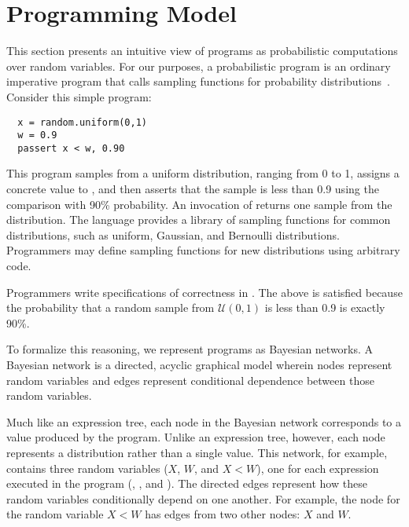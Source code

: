 \section{Programming Model}
\label{sec:model}
 
This section presents an intuitive view of programs as probabilistic
computations over random variables.
For our purposes, a probabilistic program is an ordinary imperative program
that calls sampling functions for probability distributions~\cite{kozen}.
Consider this simple program:
%
\begin{lstlisting}
  x = random.uniform(0,1)
  w = 0.9
  passert x < w, 0.90
\end{lstlisting}
%
This program samples from a uniform distribution, ranging from 0 to 1,
assigns a concrete value to , and then asserts that the sample is
less than 0.9 using the comparison  with 90\% probability.
An invocation
of  returns one sample from the distribution.
The language provides a library of sampling functions for common distributions, such as uniform, Gaussian,
and Bernoulli distributions. Programmers may define sampling functions for new distributions using
arbitrary code.

Programmers write specifications of correctness in \passerts. The above \passert is
satisfied because the probability that a random sample from 
$\mathcal{U}(0,1)$ is less than 0.9 is exactly 90\%.

To formalize this reasoning, we represent programs as Bayesian networks.
A Bayesian network is
a directed, acyclic graphical model wherein nodes represent random variables and
edges represent conditional dependence between those
random variables.
%
\begin{center}
{\scriptsize
{}
}
\end{center}
%
Much like an expression tree, each node in the Bayesian network corresponds to a value produced by the program.  Unlike an expression tree, however, each node represents a distribution rather than a single value.
This network, for example,
contains three random variables ($X$, $W$, and $X<W$), one for each
expression executed in the program (, ,
and ). The directed edges represent how these
random variables conditionally depend on one another. For example,
the node for the random variable $X
< W$ has edges from two other nodes: $X$ and $W$.

